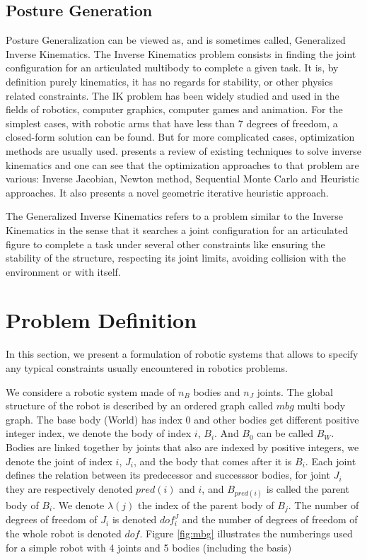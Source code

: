 \subsection{Posture Generation}
\label{sub:posture_generation}

Posture Generalization can be viewed as, and is sometimes called, Generalized Inverse Kinematics.
The Inverse Kinematics problem consists in finding the joint configuration for an articulated multibody to complete a given task.
It is, by definition purely kinematics, it has no regards for stability, or other physics related constraints.
The IK problem has been widely studied and used in the fields of robotics, computer graphics, computer games and animation.
For the simplest cases, with robotic arms that have less than 7 degrees of freedom, a closed-form solution can be found.
But for more complicated cases, optimization methods are usually used.
\cite{aristidou2009} presents a review of existing techniques to solve inverse kinematics and one can see that the optimization approaches to that problem are various: Inverse Jacobian, Newton method, Sequential Monte Carlo and Heuristic approaches. It also presents a novel geometric iterative heuristic approach.

The Generalized Inverse Kinematics refers to a problem similar to the Inverse Kinematics in the sense that it searches a joint configuration for an articulated figure to complete a task under several other constraints like ensuring the stability of the structure, respecting its joint limits, avoiding collision with the environment or with itself.


\section{Problem Definition}
\label{sec:problem_definition}

In this section, we present a formulation of robotic systems that allows to specify any typical constraints usually encountered in robotics problems.

We considere a robotic system made of $n_B$ bodies and $n_J$ joints.
The global structure of the robot is described by an ordered graph called $mbg$ multi body graph.
The base body (World) has index $0$ and other bodies get different positive integer index, we denote the body of index $i$, $B_i$. And $B_0$ can be called $B_W$.
Bodies are linked together by joints that also are indexed by positive integers, we denote the joint of index $i$, $J_i$, and the body that comes after it is $B_i$.
Each joint defines the relation between its predecessor and successsor bodies, for joint $J_i$ they are respectively denoted $pred(i)$ and $i$, and $B_{pred(i)}$ is called the parent body of $B_{i}$.
We denote $\lambda(j)$ the index of the parent body of $B_j$.
The number of degrees of freedom of $J_i$ is denoted $dof^J_i$ and the number of degrees of freedom of the whole robot is denoted $dof$.
Figure \ref{fig:mbg} illustrates the numberings used for a simple robot with 4 joints and 5 bodies (including the basis)

